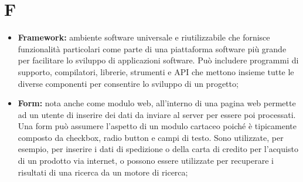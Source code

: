 %


\section*{F} %
\label{sec:f}
	\begin{itemize}
		\item \textbf{Framework:} ambiente software universale e riutilizzabile che fornisce funzionalità particolari come parte di una piattaforma software più grande per facilitare lo sviluppo di applicazioni software. Può includere programmi di supporto, compilatori, librerie, strumenti e API che mettono insieme tutte le diverse componenti per consentire lo sviluppo di un progetto;
		\item \textbf{Form:} nota anche come modulo web, all'interno di una pagina web permette ad un utente di inserire dei dati da inviare al server per essere poi processati. Una form può assumere l'aspetto di un modulo cartaceo poiché è tipicamente composto da checkbox, radio button e campi di testo. Sono utilizzate, per esempio, per inserire i dati di spedizione o della carta di credito per l'acquisto di un prodotto via internet, o possono essere utilizzate per recuperare i risultati di una ricerca da un motore di ricerca;
	\end{itemize}
\pagebreak

